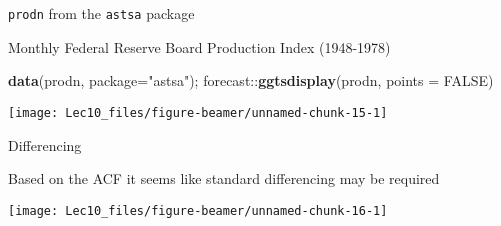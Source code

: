\documentclass[11pt,ignorenonframetext,]{beamer}
\newenvironment{Shaded}{}{}
\newcommand{\DataTypeTok}[1]{\textcolor[rgb]{0.56,0.13,0.00}{#1}}
\newcommand{\KeywordTok}[1]{\textcolor[rgb]{0.00,0.44,0.13}{\textbf{#1}}}
\newcommand{\NormalTok}[1]{#1}
\newcommand{\OperatorTok}[1]{\textcolor[rgb]{0.40,0.40,0.40}{#1}}
\newcommand{\OtherTok}[1]{\textcolor[rgb]{0.00,0.44,0.13}{#1}}
\newcommand{\StringTok}[1]{\textcolor[rgb]{0.25,0.44,0.63}{#1}}
\let\oldShaded\Shaded
\let\endoldShaded\endShaded
\renewenvironment{Shaded}{\footnotesize\begin{spacing}{0.9}\oldShaded}{\endoldShaded\end{spacing}}
\begin{document}
\begin{frame}[fragile]{\texttt{prodn} from the \texttt{astsa} package}
\protect\hypertarget{from-the-package}{}

Monthly Federal Reserve Board Production Index (1948-1978)

\begin{Shaded}
\begin{Highlighting}[]
\KeywordTok{data}\NormalTok{(prodn, }\DataTypeTok{package=}\StringTok{"astsa"}\NormalTok{); forecast}\OperatorTok{::}\KeywordTok{ggtsdisplay}\NormalTok{(prodn, }\DataTypeTok{points =} \OtherTok{FALSE}\NormalTok{)}
\end{Highlighting}
\end{Shaded}

\begin{center}\texttt{[image: Lec10\_files/figure-beamer/unnamed-chunk-15-1]} \end{center}

\end{frame}

\begin{frame}{Differencing}
\protect\hypertarget{differencing-1}{}

Based on the ACF it seems like standard differencing may be required

\begin{center}\texttt{[image: Lec10\_files/figure-beamer/unnamed-chunk-16-1]} \end{center}

\end{frame}
\end{document}
